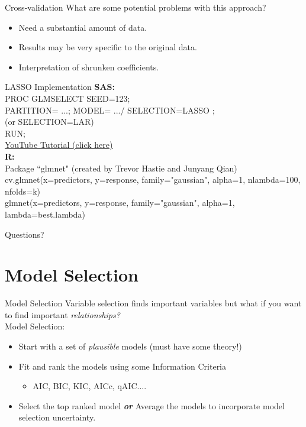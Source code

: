 \documentclass{beamer}\usepackage[]{graphicx}\usepackage[]{color}
\begin{document}
\begin{frame}{Cross-validation}
What are some potential problems with this approach?
\bigskip
\pause
\begin{itemize}
\item Need a substantial amount of data.
\pause
\bigskip
\item Results may be very specific to the original data.
\pause
\bigskip
\item Interpretation of shrunken coefficients.
\end{itemize}
\end{frame}

\begin{frame}{LASSO Implementation}
\textbf{SAS:}\\
PROC GLMSELECT  SEED=123;  \\
PARTITION= ...;
MODEL= .../ SELECTION=LASSO ;\\
(or SELECTION=LAR)\\
RUN;\\

\smallskip
\hyperlink{https://www.youtube.com/watch?v=bWhJ9ixN8e0}{YouTube Tutorial (click here)}\\

\bigskip
\textbf{R:}\\
Package ``glmnet" (created by Trevor Hastie and Junyang Qian)\\
\smallskip
cv.glmnet(x=predictors, y=response, family="gaussian", alpha=1, nlambda=100, nfolds=k)\\
\smallskip
glmnet(x=predictors, y=response, family="gaussian", alpha=1, lambda=best.lambda)\\
\end{frame}

\begin{frame}
Questions?
\end{frame}

\section{Model Selection}

\begin{frame}{Model Selection}
Variable selection finds important variables but what if you want to find important \emph{relationships?}\\
\pause
Model Selection:
\begin{itemize}
\pause
\item Start with a set of \emph{plausible} models (must have some theory!)
\pause
\item Fit and rank the models using some Information Criteria
  \begin{itemize}
  \item AIC, BIC, KIC, AICc, qAIC....
  \end{itemize}
  \pause
\item Select the top ranked model \textbf{\emph{or}} Average the models to incorporate model selection uncertainty.
\end{itemize}
\end{frame}
\end{document}
